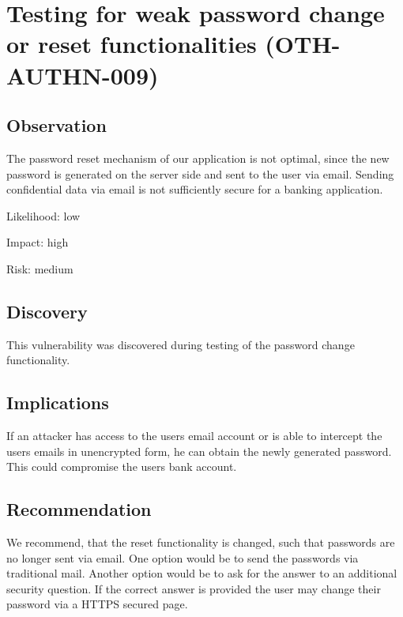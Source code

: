 \section{Testing for weak password change or reset functionalities (OTH-AUTHN-009)}
\subsection{Observation}
The password reset mechanism of our application is not optimal, since the new password is generated on the server side and sent to the user via email. Sending confidential data via email is not sufficiently secure for a banking application.

Likelihood: low \newline

Impact: high\newline

Risk: medium\newline
\subsection{Discovery}
This vulnerability was discovered during testing of the password change functionality.
\subsection{Implications}
If an attacker has access to the users email account or is able to intercept the users emails in unencrypted form, he can obtain the newly generated password. This could compromise the users bank account. 
\subsection{Recommendation}
We recommend, that the reset functionality is changed, such that passwords are no longer sent via email. One option would be to send the passwords via traditional mail. Another option would be to ask for the answer to an additional security question. If the correct answer is provided the user may change their password via a HTTPS secured page.